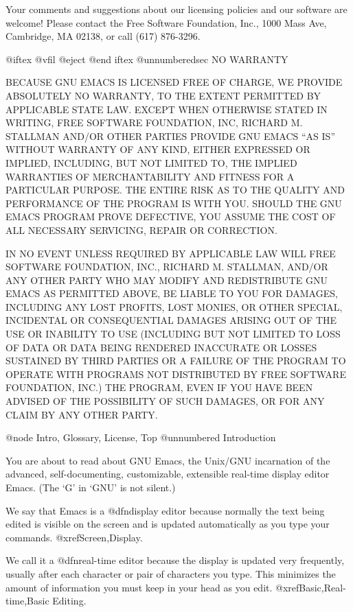 Your comments and suggestions about our licensing policies and our
software are welcome!  Please contact the Free Software Foundation, Inc.,
1000 Mass Ave, Cambridge, MA 02138, or call (617) 876-3296.

@iftex
@vfil
@eject
@end iftex
@unnumberedsec NO WARRANTY

  BECAUSE GNU EMACS IS LICENSED FREE OF CHARGE, WE PROVIDE ABSOLUTELY
NO WARRANTY, TO THE EXTENT PERMITTED BY APPLICABLE STATE LAW.  EXCEPT
WHEN OTHERWISE STATED IN WRITING, FREE SOFTWARE FOUNDATION, INC,
RICHARD M. STALLMAN AND/OR OTHER PARTIES PROVIDE GNU EMACS ``AS IS''
WITHOUT WARRANTY OF ANY KIND, EITHER EXPRESSED OR IMPLIED, INCLUDING,
BUT NOT LIMITED TO, THE IMPLIED WARRANTIES OF MERCHANTABILITY AND
FITNESS FOR A PARTICULAR PURPOSE.  THE ENTIRE RISK AS TO THE QUALITY
AND PERFORMANCE OF THE PROGRAM IS WITH YOU.  SHOULD THE GNU EMACS
PROGRAM PROVE DEFECTIVE, YOU ASSUME THE COST OF ALL NECESSARY
SERVICING, REPAIR OR CORRECTION.

 IN NO EVENT UNLESS REQUIRED BY APPLICABLE LAW WILL FREE SOFTWARE
FOUNDATION, INC., RICHARD M. STALLMAN, AND/OR ANY OTHER PARTY WHO MAY
MODIFY AND REDISTRIBUTE GNU EMACS AS PERMITTED ABOVE, BE LIABLE TO YOU
FOR DAMAGES, INCLUDING ANY LOST PROFITS, LOST MONIES, OR OTHER
SPECIAL, INCIDENTAL OR CONSEQUENTIAL DAMAGES ARISING OUT OF THE USE OR
INABILITY TO USE (INCLUDING BUT NOT LIMITED TO LOSS OF DATA OR DATA
BEING RENDERED INACCURATE OR LOSSES SUSTAINED BY THIRD PARTIES OR A
FAILURE OF THE PROGRAM TO OPERATE WITH PROGRAMS NOT DISTRIBUTED BY
FREE SOFTWARE FOUNDATION, INC.) THE PROGRAM, EVEN IF YOU HAVE BEEN
ADVISED OF THE POSSIBILITY OF SUCH DAMAGES, OR FOR ANY CLAIM BY ANY
OTHER PARTY.

@node Intro, Glossary, License, Top
@unnumbered Introduction

  You are about to read about GNU Emacs, the Unix/GNU incarnation of the
advanced, self-documenting, customizable, extensible real-time display
editor Emacs.  (The `G' in `GNU' is not silent.)

  We say that Emacs is a @dfn{display} editor because normally the text
being edited is visible on the screen and is updated automatically as you
type your commands.  @xref{Screen,Display}.

  We call it a @dfn{real-time} editor because the display is updated very
frequently, usually after each character or pair of characters you
type.  This minimizes the amount of information you must keep in your
head as you edit.  @xref{Basic,Real-time,Basic Editing}.

